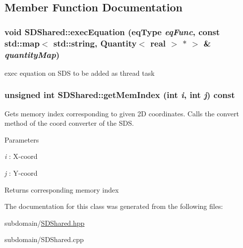 \subsection{Member Function Documentation}
\hypertarget{classSDShared_afc27ac7db0bcb8177f54bb5a682606c1}{
\subsubsection[{execEquation}]{\setlength{\rightskip}{0pt plus 5cm}void SDShared::execEquation (eqType {\em eqFunc}, \/  const std::map$<$ std::string, {\bf Quantity}$<$ real $>$ $\ast$ $>$ \& {\em quantityMap})}}
\label{classSDShared_afc27ac7db0bcb8177f54bb5a682606c1}
exec equation on SDS to be added as thread task \hypertarget{classSDShared_a0ee0c276ea09e1bd0aea8e4930ebe253}{
\subsubsection[{getMemIndex}]{\setlength{\rightskip}{0pt plus 5cm}unsigned int SDShared::getMemIndex (int {\em i}, \/  int {\em j}) const}}
\label{classSDShared_a0ee0c276ea09e1bd0aea8e4930ebe253}


Gets memory index corresponding to given 2D coordinates. Calls the convert method of the coord converter of the SDS. 
\begin{DoxyParams}{Parameters}
\item[{\em i}]: X-\/coord \item[{\em j}]: Y-\/coord\end{DoxyParams}
\begin{DoxyReturn}{Returns}
corresponding memory index 
\end{DoxyReturn}


The documentation for this class was generated from the following files:\begin{DoxyCompactItemize}
\item 
subdomain/\hyperlink{SDShared_8hpp}{SDShared.hpp}\item 
subdomain/SDShared.cpp\end{DoxyCompactItemize}
